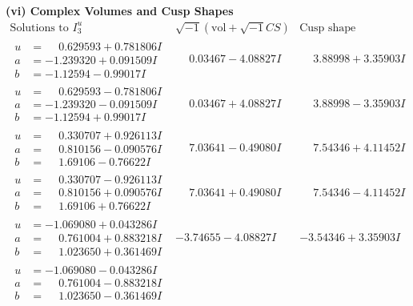 \documentclass[1p]{elsarticle_modified}
\theoremstyle{definition}
\newcommand{\I}{\sqrt{-1}}
\begin{document}
\newpage\flushleft \textbf{(vi) Complex Volumes and Cusp Shapes}
$$\begin{array}{c|c|c}  
\text{Solutions to }I^u_{3}& \I (\text{vol} + \sqrt{-1}CS) & \text{Cusp shape}\\
 \hline 
\begin{aligned}
u &= \phantom{-}0.629593 + 0.781806 I \\
a &= -1.239320 + 0.091509 I \\
b &= -1.12594 - 0.99017 I\end{aligned}
 & \phantom{-}0.03467 - 4.08827 I & \phantom{-}3.88998 + 3.35903 I \\ \hline\begin{aligned}
u &= \phantom{-}0.629593 - 0.781806 I \\
a &= -1.239320 - 0.091509 I \\
b &= -1.12594 + 0.99017 I\end{aligned}
 & \phantom{-}0.03467 + 4.08827 I & \phantom{-}3.88998 - 3.35903 I \\ \hline\begin{aligned}
u &= \phantom{-}0.330707 + 0.926113 I \\
a &= \phantom{-}0.810156 - 0.090576 I \\
b &= \phantom{-}1.69106 - 0.76622 I\end{aligned}
 & \phantom{-}7.03641 - 0.49080 I & \phantom{-}7.54346 + 4.11452 I \\ \hline\begin{aligned}
u &= \phantom{-}0.330707 - 0.926113 I \\
a &= \phantom{-}0.810156 + 0.090576 I \\
b &= \phantom{-}1.69106 + 0.76622 I\end{aligned}
 & \phantom{-}7.03641 + 0.49080 I & \phantom{-}7.54346 - 4.11452 I \\ \hline\begin{aligned}
u &= -1.069080 + 0.043286 I \\
a &= \phantom{-}0.761004 + 0.883218 I \\
b &= \phantom{-}1.023650 + 0.361469 I\end{aligned}
 & -3.74655 - 4.08827 I & -3.54346 + 3.35903 I \\ \hline\begin{aligned}
u &= -1.069080 - 0.043286 I \\
a &= \phantom{-}0.761004 - 0.883218 I \\
b &= \phantom{-}1.023650 - 0.361469 I\end{aligned}

\end{array}$$
\end{document}
